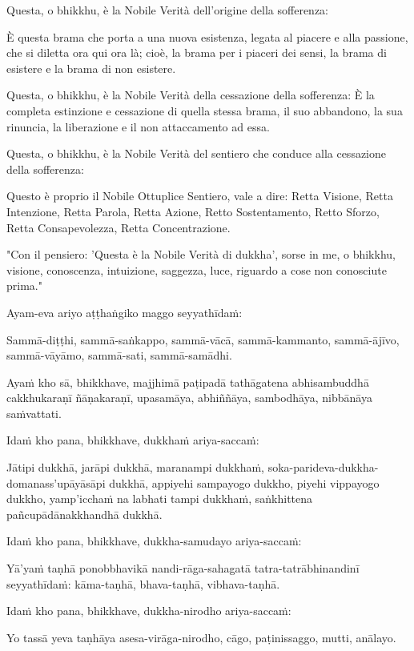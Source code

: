 Questa, o bhikkhu, è la Nobile Verità dell'origine della sofferenza:

È questa brama che porta a una nuova esistenza, legata al piacere e alla passione,
che si diletta ora qui ora là; cioè, la brama per i piaceri dei sensi,
la brama di esistere e la brama di non esistere.

Questa, o bhikkhu, è la Nobile Verità della cessazione della sofferenza:
È la completa estinzione e cessazione di quella stessa brama, il suo abbandono,
la sua rinuncia, la liberazione e il non attaccamento ad essa.

Questa, o bhikkhu, è la Nobile Verità del sentiero che conduce alla cessazione della sofferenza:


Questo è proprio il Nobile Ottuplice Sentiero, vale a dire: Retta Visione,
Retta Intenzione, Retta Parola, Retta Azione, Retto Sostentamento, Retto Sforzo,
Retta Consapevolezza, Retta Concentrazione.

"Con il pensiero: 'Questa è la Nobile Verità di dukkha',
sorse in me, o bhikkhu, visione, conoscenza, intuizione,
  saggezza, luce, riguardo a cose non conosciute prima."

\clearpage

\paliText
\markboth{\paliTitle}{\rightmark}

Ayam-eva ariyo aṭṭhaṅgiko maggo seyyathīdaṁ:

Sammā-diṭṭhi, sammā-saṅkappo, sammā-vācā, sammā-kammanto, sammā-ājīvo,
sammā-vāyāmo, sammā-sati, sammā-samādhi.

Ayaṁ kho sā, bhikkhave, majjhimā paṭipadā tathāgatena abhisambuddhā
cakkhukaraṇī ñāṇakaraṇī, upasamāya, abhiññāya, sambodhāya, nibbānāya
saṁvattati.

Idaṁ kho pana, bhikkhave, dukkhaṁ ariya-saccaṁ:

Jātipi dukkhā, jarāpi dukkhā, maranampi dukkhaṁ,
soka-parideva-dukkha-domanass'upāyāsāpi dukkhā, appiyehi sampayogo
dukkho, piyehi vippayogo dukkho, yamp'icchaṁ na labhati tampi dukkhaṁ,
saṅkhittena pañcupādānakkhandhā dukkhā.

Idaṁ kho pana, bhikkhave, dukkha-samudayo ariya-saccaṁ:

Yā'yaṁ taṇhā ponobbhavikā nandi-rāga-sahagatā tatra-tatrābhinandinī
seyyathīdaṁ: kāma-taṇhā, bhava-taṇhā, vibhava-taṇhā.

Idaṁ kho pana, bhikkhave, dukkha-nirodho ariya-saccaṁ:

Yo tassā yeva taṇhāya asesa-virāga-nirodho, cāgo, paṭinissaggo, mutti,
anālayo.

